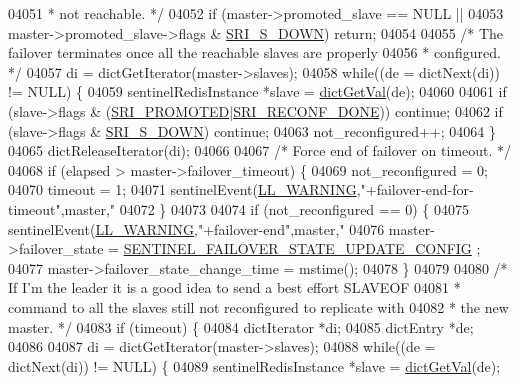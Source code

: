 \begin{DoxyCode}
{{{{{{{{{{{{{{{{{{{{{{{{{{{{{{{{{{{{{{{{{{{{{{{{{{{{{{{{{{{{{{{{{{{{{{{{{{{{{{{{{{{{{{{{{{{{{{{{04051 \textcolor{comment}{     * not reachable. */}
04052     \textcolor{keywordflow}{if} (master->promoted\_slave == NULL ||
04053         master->promoted\_slave->flags & \hyperlink{sentinel_8c_a8e26596c8bde451c2dd9cecb2c3046d4}{SRI\_S\_DOWN}) \textcolor{keywordflow}{return};
04054 
04055     \textcolor{comment}{/* The failover terminates once all the reachable slaves are properly}
04056 \textcolor{comment}{     * configured. */}
04057     di = dictGetIterator(master->slaves);
04058     \textcolor{keywordflow}{while}((de = dictNext(di)) != NULL) \{
04059         sentinelRedisInstance *slave = \hyperlink{dict_8h_ae8d2cc391873b2bea2b87c4f80f43120}{dictGetVal}(de);
04060 
04061         \textcolor{keywordflow}{if} (slave->flags & (\hyperlink{sentinel_8c_a6c6c019b1af48a9c0e9507422051c684}{SRI\_PROMOTED}|\hyperlink{sentinel_8c_adb468d0a8c96c954b6af26aa670d7a11}{SRI\_RECONF\_DONE})) \textcolor{keywordflow}{continue};
04062         \textcolor{keywordflow}{if} (slave->flags & \hyperlink{sentinel_8c_a8e26596c8bde451c2dd9cecb2c3046d4}{SRI\_S\_DOWN}) \textcolor{keywordflow}{continue};
04063         not\_reconfigured++;
04064     \}
04065     dictReleaseIterator(di);
04066 
04067     \textcolor{comment}{/* Force end of failover on timeout. */}
04068     \textcolor{keywordflow}{if} (elapsed > master->failover\_timeout) \{
04069         not\_reconfigured = 0;
04070         timeout = 1;
04071         sentinelEvent(\hyperlink{server_8h_a31229b9334bba7d6be2a72970967a14b}{LL\_WARNING},\textcolor{stringliteral}{"+failover-end-for-timeout"},master,\textcolor{stringliteral}{"%
04072     \}
04073 
04074     \textcolor{keywordflow}{if} (not\_reconfigured == 0) \{
04075         sentinelEvent(\hyperlink{server_8h_a31229b9334bba7d6be2a72970967a14b}{LL\_WARNING},\textcolor{stringliteral}{"+failover-end"},master,\textcolor{stringliteral}{"%
04076         master->failover\_state = \hyperlink{sentinel_8c_a2b6f5592dea88534b287c71e46181ed3}{SENTINEL\_FAILOVER\_STATE\_UPDATE\_CONFIG}
      ;
04077         master->failover\_state\_change\_time = mstime();
04078     \}
04079 
04080     \textcolor{comment}{/* If I'm the leader it is a good idea to send a best effort SLAVEOF}
04081 \textcolor{comment}{     * command to all the slaves still not reconfigured to replicate with}
04082 \textcolor{comment}{     * the new master. */}
04083     \textcolor{keywordflow}{if} (timeout) \{
04084         dictIterator *di;
04085         dictEntry *de;
04086 
04087         di = dictGetIterator(master->slaves);
04088         \textcolor{keywordflow}{while}((de = dictNext(di)) != NULL) \{
04089             sentinelRedisInstance *slave = \hyperlink{dict_8h_ae8d2cc391873b2bea2b87c4f80f43120}{dictGetVal}(de);
}}}}}}}}}}}}}}}}}}}}}}}}}}}}}}}}}}}}}}}}}}}}}}}}}}}}}}}}}}}}}}}}}}}}}}}}}}}}}}}}}}}}}}}}}}}}}}}}}}
\end{DoxyCode}
